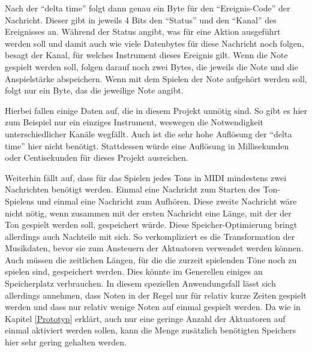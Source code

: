 Nach der \enquote{delta time} folgt dann genau ein Byte für den \enquote{Ereignis-Code} der Nachricht.
Dieser gibt in jeweils 4 Bits den \enquote{Status} und den \enquote{Kanal} des Ereignisses an.
Während der Status angibt, was für eine Aktion ausgeführt werden soll und damit auch wie viele Datenbytes für diese Nachricht noch folgen, besagt der Kanal, für welches Instrument dieses Ereignis gilt.
Wenn die Note gespielt werden soll, folgen darauf noch zwei Bytes, die jeweils die Note und die Anspielstärke abspeichern.
Wenn mit dem Spielen der Note aufgehört werden soll, folgt nur ein Byte, das die jeweilige Note angibt.

Hierbei fallen einige Daten auf, die in diesem Projekt unnötig sind.
So gibt es hier zum Beispiel nur ein einziges Instrument, weswegen die Notwendigkeit unterschiedlicher Kanäle wegfällt.
Auch ist die sehr hohe Auflösung der \enquote{delta time} hier nicht benötigt.
Stattdessen würde eine Auflösung in Millisekunden oder Centisekunden für dieses Projekt ausreichen.

Weiterhin fällt auf, dass für das Spielen jedes Tons in \ac{MIDI} mindestens zwei Nachrichten benötigt werden.
Einmal eine Nachricht zum Starten des Ton-Spielens und einmal eine Nachricht zum Aufhören.
Diese zweite Nachricht wäre nicht nötig, wenn zusammen mit der ersten Nachricht eine Länge, mit der der Ton gespielt werden soll, gespeichert würde.
Diese Speicher-Optimierung bringt allerdings auch Nachteile mit sich.
So verkompliziert es die Transformation der Musikdaten, bevor sie zum Ansteuern der Aktuatoren verwendet werden können.
Auch müssen die zeitlichen Längen, für die die zurzeit spielenden Töne noch zu spielen sind, gespeichert werden.
Dies könnte im Generellen einiges an Speicherplatz verbrauchen.
In diesem speziellen Anwendungsfall lässt sich allerdings annehmen, dass Noten in der Regel nur für relativ kurze Zeiten gespielt werden und dass nur relativ wenige Noten auf einmal gespielt werden.
Da wie in Kapitel \ref{Prototyp} erklärt, auch nur eine geringe Anzahl der Aktuatoren auf einmal aktiviert werden sollen, kann die Menge zusätzlich benötigten Speichers hier sehr gering gehalten werden.

